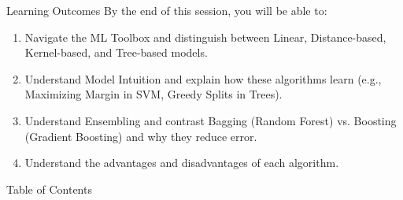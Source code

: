 
\begin{frame}{Learning Outcomes}
    By the end of this session, you will be able to:
    
    \vspace{0.5em}
    \begin{enumerate}
        \item Navigate the ML Toolbox and distinguish between Linear, Distance-based, Kernel-based, and Tree-based models.
        \item Understand Model Intuition and explain how these algorithms learn (e.g., Maximizing Margin in SVM, Greedy Splits in Trees).
        \item Understand Ensembling and contrast Bagging (Random Forest) vs. Boosting (Gradient Boosting) and why they reduce error.
        \item Understand the advantages and disadvantages of each algorithm.
    \end{enumerate}
    
\end{frame}



\begin{frame}{Table of Contents}
    \tableofcontents
\end{frame}


